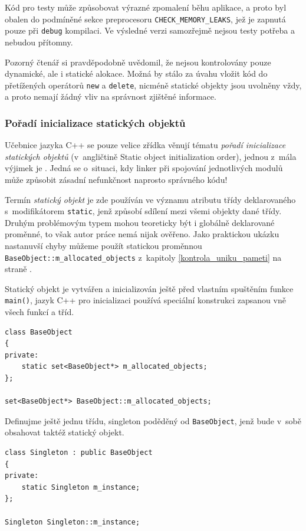 \documentclass[11pt,twoside,a4paper]{book}
\begin{document}
Kód pro testy může způsobovat výrazné zpomalení běhu aplikace, a proto byl obalen do podmíněné sekce preprocesoru \texttt{CHECK\_MEMORY\_LEAKS}, jež je zapnutá pouze při \texttt{debug} kompilaci. Ve výsledné verzi samozřejmě nejsou testy potřeba a nebudou přítomny.

Pozorný čtenář si pravděpodobně uvědomil, že nejsou kontrolovány pouze dynamické, ale i statické alokace. Možná by stálo za úvahu vložit kód do přetížených operátorů \texttt{new} a \texttt{delete}, nicméně statické objekty jsou uvolněny vždy, a proto nemají žádný vliv na správnost zjištěné informace.


\subsubsection{Pořadí inicializace statických objektů}

Učebnice jazyka C++ se pouze velice zřídka věnují tématu \textit{pořadí inicializace statických objektů} (v~angličtině Static object initialization order), jednou z~mála výjimek je \cite{industrial_strength_cpp}. Jedná se o~situaci, kdy linker při spojování jednotlivých modulů může způsobit zásadní nefunkčnost naprosto správného kódu!

Termín \textit{statický objekt} je zde používán ve významu atributu třídy deklarovaného s~modifikátorem \texttt{static}, jenž způsobí sdílení mezi všemi objekty dané třídy. Druhým problémovým typem mohou teoreticky být i globálně deklarované proměnné, to však autor práce nemá nijak ověřeno. Jako praktickou ukázku nastanuvší chyby můžeme použít statickou proměnnou \texttt{BaseObject::m\_allocated\_objects} z~kapitoly \ref{kontrola_uniku_pameti} na straně \pageref{kontrola_uniku_pameti}.

Statický objekt je vytvářen a inicializován ještě před vlastním spuštěním funkce \texttt{main()}, jazyk C++ pro inicializaci používá speciální konstrukci zapsanou vně všech funkcí a tříd.

\begin{verbatim}
class BaseObject
{
private:
    static set<BaseObject*> m_allocated_objects;
};

set<BaseObject*> BaseObject::m_allocated_objects;
\end{verbatim}

Definujme ještě jednu třídu, singleton poděděný od \texttt{BaseObject}, jenž bude v~sobě obsahovat taktéž statický objekt.

\begin{verbatim}
class Singleton : public BaseObject
{
private:
    static Singleton m_instance;
};

Singleton Singleton::m_instance;
\end{verbatim}
\end{document}
